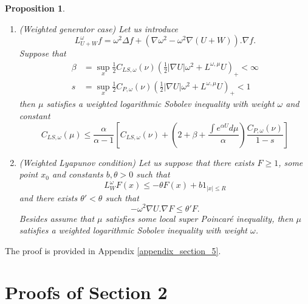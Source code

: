 \documentclass[11pt,reqno]{amsart}
\numberwithin{equation}{section}
\newtheorem{proposition}[theorem]{Proposition}
\theoremstyle{definition}
\theoremstyle{remark}
\begin{document}
\begin{proposition}
\begin{enumerate}
\begin{enumerate}
    Alternatively, assuming that there exists $\varepsilon$ such that $s$ defined above satisfies $s<1$, then $\mu$ satisfies a weighted logarithmic Sobolev inequality with weight $\tilde\omega = \omega e^{U^+/2}/(\int e^{U^-}d\nu)^{1/2}$ and constant
    $$
    C_{LS, \tilde\omega}(\mu) \leq \left(\int e^{U^-}d\nu\right)\frac{1+\varepsilon^{-1}}{1-s}((2-s)C_{LS, \omega}(\nu) + (2 + M_U)C_{P, \omega}(\nu)), 
    $$
    where $U^+$ and $U^-$ denote the positive and negative part of $U$, respectively.
    \item (Weighted generator case) Let us introduce
    $$L_{U+W}^{\omega}f = \omega^2 \Delta f +(\nabla \omega^2-\omega^2 \nabla (U+ W)) .\nabla f .$$
    Suppose that
    \begin{align*}
    \beta &=\sup_x \frac{1}{2}C_{LS,\omega}(\nu)\left(\frac12|\nabla U|\omega^2+L^{\omega,\mu}U\right)_+<\infty\\
    s&=\sup_x \frac{1}{2}C_{P,\omega}(\nu)\left(\frac12|\nabla U|\omega^2+L^{\omega,\mu}U\right)_+<1  
    \end{align*}
    then $\mu$ satisfies a weighted logarithmic Sobolev inequality with weight $\omega$ and constant
    $$C_{LS,\omega}(\mu)\le\frac{\alpha}{\alpha-1}\left[ C_{LS,\omega}(\nu) + \left(2+\beta + \frac{\int e^{\alpha U} d\mu}{\alpha}\right)\frac{C_{P,\omega}(\nu)}{1-s}\right]$$
    \item (Weighted Lyapunov condition) Let us suppose that there exists $F\ge 1$, some point $x_0$ and constants $b,\theta>0$ such that
     \begin{equation}\label{lyapw_LSI}
    L_W^\omega F(x)\le -\theta F(x) +b 1_{|x|\le R}
    \end{equation}
    and there exists $\theta'<\theta$ such that
    $$-\omega^2\nabla U.\nabla F\le \theta' F.$$
    Besides assume that $\mu$ satisfies some local super Poincar\'e inequality, 
    then $\mu$ satisfies a weighted logarithmic Sobolev inequality with weight $\omega$.
\end{enumerate}
\end{enumerate}
\end{proposition}
The proof is provided in Appendix \ref{appendix_section_5}.

\newpage

\appendix


\section{Proofs of Section 2}\label{appendix_section_2}
\end{document}
